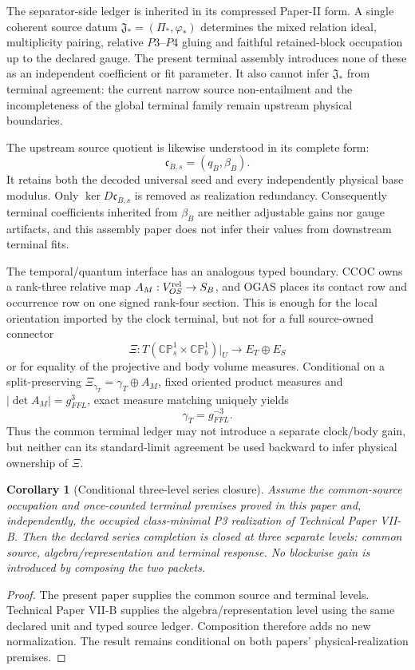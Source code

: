 \documentclass[11pt]{article}
\newtheorem{corollary}{Corollary}
\begin{document}
The separator-side ledger is inherited in its compressed Paper-II form.  A
single coherent source datum $\mathfrak J_*=(\Pi_*,\varphi_*)$ determines the
mixed relation ideal, multiplicity pairing, relative $P3$--$P4$ gluing and
faithful retained-block occupation up to the declared gauge.  The present
terminal assembly introduces none of these as an independent coefficient or
fit parameter.  It also cannot infer $\mathfrak J_*$ from terminal agreement:
the current narrow source non-entailment and the incompleteness of the global
terminal family remain upstream physical boundaries.

The upstream source quotient is likewise understood in its complete form:
\[
 \mathfrak c_{B,s}=(q_B,\beta_B).
\]
It retains both the decoded universal seed and every independently physical
base modulus. Only $\ker D\mathfrak c_{B,s}$ is removed as realization
redundancy. Consequently terminal coefficients inherited from $\beta_B$ are
neither adjustable gains nor gauge artifacts, and this assembly paper does
not infer their values from downstream terminal fits.

The temporal/quantum interface has an analogous typed boundary.  CCOC owns a
rank-three relative map $A_M:V_{OS}^{\rm rel}\to S_B$, and OGAS places its
contact row and occurrence row on one signed rank-four section.  This is
enough for the local orientation imported by the clock terminal, but not for a
full source-owned connector
\begin{equation}
 \Xi:T(\mathbb{CP}^{1}_{s}\times\mathbb{CP}^{1}_{b})|_U
 \longrightarrow E_T\oplus E_S
 \label{eq:joint-projective-body-connector}
\end{equation}
or for equality of the projective and body volume measures.  Conditional on a
split-preserving $\Xi_{\gamma_T}=\gamma_T\oplus A_M$, fixed oriented product
measures and $|\det A_M|=g_{FFL}^{3}$, exact measure matching uniquely yields
\begin{equation}
 \gamma_T=g_{FFL}^{-3}.
 \label{eq:joint-common-line-normalization}
\end{equation}
Thus the common terminal ledger may not introduce a separate clock/body gain,
but neither can its standard-limit agreement be used backward to infer
physical ownership of $\Xi$.

\begin{corollary}[Conditional three-level series closure]
Assume the common-source occupation and once-counted terminal premises proved
in this paper and, independently, the occupied class-minimal P3 realization of
Technical Paper VII-B. Then the declared series completion is closed at three
separate levels: common source, algebra/representation and terminal response.
No blockwise gain is introduced by composing the two packets.
\end{corollary}
\begin{proof}
The present paper supplies the common source and terminal levels. Technical
Paper VII-B supplies the algebra/representation level using the same declared
unit and typed source ledger. Composition therefore adds no new normalization.
The result remains conditional on both papers' physical-realization premises.
\end{proof}
\end{document}
